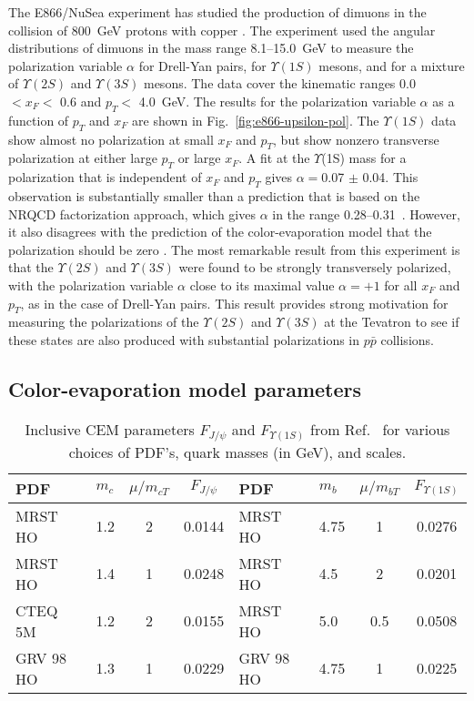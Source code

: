 The E866/NuSea experiment has studied the production of dimuons in the
collision of 800~GeV protons with copper \cite{Brown:2000bz}. The
experiment used the angular distributions of dimuons in
the mass range 8.1--15.0~GeV to measure
the polarization variable $\alpha$ for Drell-Yan
pairs, for $\Upsilon(1S)$ mesons, and for a mixture of $\Upsilon(2S)$
and $\Upsilon(3S)$ mesons. The data cover the kinematic ranges 0.0 $<
x_F <$ 0.6 and $p_T <$ 4.0~GeV. The results for the polarization
variable $\alpha$ as a function of $p_T$ and $x_F$ are shown in
Fig.~\ref{fig:e866-upsilon-pol}. The $\Upsilon(1S)$ data show almost no
polarization at small $x_F$ and $p_T$, but show nonzero transverse
polarization at either large $p_T$ or large $x_F$. A fit at the
$\Upsilon$(1S) mass for a polarization that is independent of $x_F$ and
$p_T$ gives $\alpha =$0.07 $\pm$ 0.04. This
observation is substantially smaller than a prediction that is based
on the NRQCD factorization approach, which gives $\alpha$ in the range
0.28--0.31~\cite{Kharchilava:1998wa,Tkabladze:1999mb}. However, it
also disagrees with the prediction of the color-evaporation model
that the polarization should be zero \cite{Amundson:1996qr}. The most
remarkable result from this experiment is that the
$\Upsilon(2S)$ and $\Upsilon(3S)$ were found to be strongly
transversely polarized, with the polarization variable $\alpha$ close to
its maximal value $\alpha = +1$ for all $x_F$ and $p_T$, as in the
case of Drell-Yan pairs. This result provides strong motivation
for measuring the polarizations of the $\Upsilon(2S)$ and $\Upsilon(3S)$
at the Tevatron to see if these states are also produced with
substantial polarizations in $p \bar p$ collisions.


\subsection{Color-evaporation model parameters}
\label{prodsec:fixed-targetCEM}

\begin{table}[ht]
\begin{center}
\begin{tabular}{|llcc||llcc|}
\hline \hline
PDF & $m_c$ & $\mu/m_{cT}$ & $F_{J/\psi}$ & 
PDF & $m_b$ & $\mu/m_{bT}$ & $F_{\Upsilon(1S)}$ \\ \hline
MRST HO & 1.2 & 2   & 0.0144  &
MRST HO & 4.75 & 1   & 0.0276 \\
MRST HO & 1.4 & 1   & 0.0248  &
MRST HO & 4.5  & 2   & 0.0201 \\
CTEQ 5M & 1.2 & 2   & 0.0155  &
MRST HO & 5.0  & 0.5 & 0.0508 \\
GRV 98 HO & 1.3 & 1 & 0.0229  &
GRV 98 HO & 4.75 & 1 & 0.0225 \\ 
\hline \hline
\end{tabular}
\caption{
Inclusive CEM parameters $F_{J/\psi}$ and $F_{\Upsilon(1S)}$
from Ref.~\cite{Bedjidian:2003gd}
for various choices of PDF's, quark masses (in GeV), and scales.
}
\label{prodsec:qqbparams}
\end{center}
\end{table}

